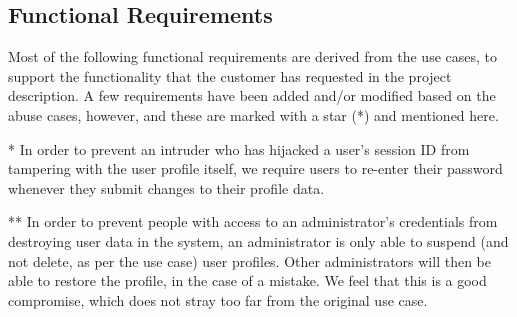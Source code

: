 \documentclass[a4paper]{article}
\begin{document}
\subsection{Functional Requirements}
Most of the following functional requirements are derived from the use cases, to support the functionality that the customer has requested in the project description. A few requirements have been added and/or modified based on the abuse cases, however, and these are marked with a star (*) and mentioned here.

* In order to prevent an intruder who has hijacked a user's session ID from tampering with the user profile itself, we require users to re-enter their password whenever they submit changes to their profile data.

** In order to prevent people with access to an administrator's credentials from destroying user data in the system, an administrator is only able to suspend (and not delete, as per the use case) user profiles. Other administrators will then be able to restore the profile, in the case of a mistake. We feel that this is a good compromise, which does not stray too far from the original use case.
\end{document}
